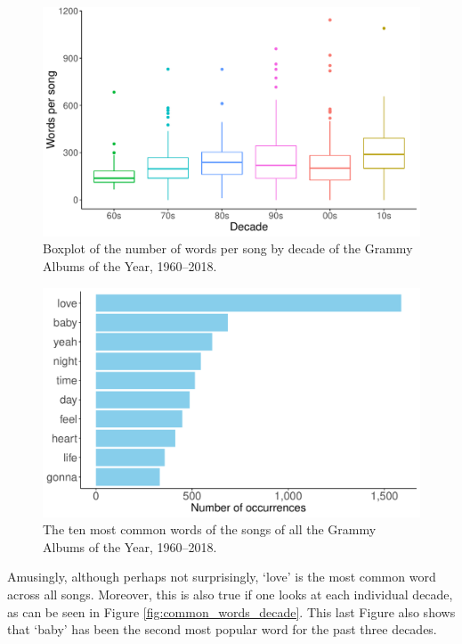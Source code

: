 \documentclass{article}
\begin{document}
\begin{figure}[h]
    \centering
    \includegraphics[scale=0.5]{Plots/Boxplot_WpS.pdf}
    \caption{Boxplot of the number of words per song by decade of the Grammy Albums of the Year, 1960--2018.}
    \label{fig:boxplot_WpS}
\end{figure}





\begin{figure}[h]
    \centering
    \includegraphics[scale=0.5]{Plots/graph_common_words.pdf}
    \caption{The ten most common words of the songs of all the Grammy Albums of the Year, 1960--2018.}
    \label{fig:common_words}
\end{figure}


Amusingly, although perhaps not surprisingly, `love' is the most common word across all songs. Moreover, this is also true if one looks at each individual decade, as can be seen in Figure \ref{fig:common_words_decade}. This last Figure also shows that `baby' has been the second most popular word for the past three decades.
\end{document}
